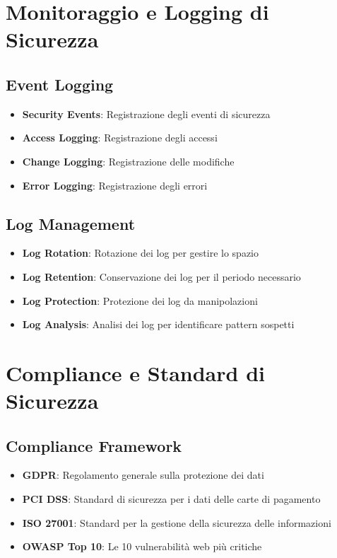 \section{Monitoraggio e Logging di Sicurezza}

\subsection{Event Logging}
\begin{itemize}
    \item \textbf{Security Events}: Registrazione degli eventi di sicurezza
    \item \textbf{Access Logging}: Registrazione degli accessi
    \item \textbf{Change Logging}: Registrazione delle modifiche
    \item \textbf{Error Logging}: Registrazione degli errori
\end{itemize}

\subsection{Log Management}
\begin{itemize}
    \item \textbf{Log Rotation}: Rotazione dei log per gestire lo spazio
    \item \textbf{Log Retention}: Conservazione dei log per il periodo necessario
    \item \textbf{Log Protection}: Protezione dei log da manipolazioni
    \item \textbf{Log Analysis}: Analisi dei log per identificare pattern sospetti
\end{itemize}

\section{Compliance e Standard di Sicurezza}

\subsection{Compliance Framework}
\begin{itemize}
    \item \textbf{GDPR}: Regolamento generale sulla protezione dei dati
    \item \textbf{PCI DSS}: Standard di sicurezza per i dati delle carte di pagamento
    \item \textbf{ISO 27001}: Standard per la gestione della sicurezza delle informazioni
    \item \textbf{OWASP Top 10}: Le 10 vulnerabilità web più critiche
\end{itemize}

